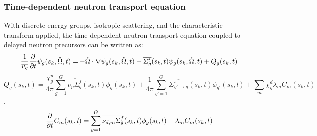 \begin{frame}
  \frametitle{Time-dependent neutron transport equation}
    With discrete energy groups, isotropic scattering, and the characteristic
    transform applied, the time-dependent neutron transport equation coupled
    to delayed neutron precursors can be written as:
    \begin{equation}
        \label{eq:nte}
        \frac{1}{\overline{v_g}}\frac{\partial}{\partial t} \psi_g(s_k, \hat{\Omega}, t) = -\hat{\Omega}\cdot \nabla\psi_g(s_k, \hat{\Omega}, t) -
        \overline{\Sigma^t_g}(s_{k}, t)\psi_g(s_k, \hat{\Omega}, t) + Q_g(s_{k}, t)
    \end{equation}
    \begin{equation} Q_g(s_{k}, t) = \frac{\chi_g^p}{4\pi} \sum_{g=1}^G
        \label{eq:source}
        \overline{\nu_{p}\Sigma^f_g}(s_{k}, t)\phi_g(s_{k}, t) + \frac{1}{4\pi}\sum_{g'=1}^G
        \overline{\Sigma^s_{g'\rightarrow g}}(s_{k}, t) \phi_{g'}(s_{k}, t) +
        \sum_m \chi^d_g \lambda_m C_m(s_{k}, t)
    \end{equation}. 
    \begin{equation}
        \label{eq:precursors}
        \frac{\partial}{\partial t} C_m(s_{k}, t) = \sum_{g=1}^G
        \overline{\nu_{d,m}\Sigma_g^f}(s_{k},t)\phi_g(s_{k}, t) - \lambda_m
        C_m(s_{k},t)
    \end{equation}
\end{frame}
